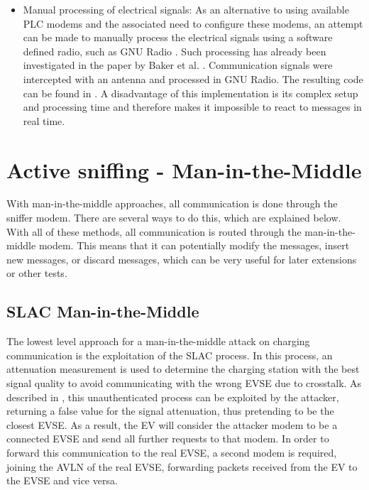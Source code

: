 \documentclass[sigconf]{acmart}
\begin{document}
\begin{itemize}
    \item Manual processing of electrical signals: As an alternative to using available PLC modems and the associated need to configure these modems, an attempt can be made to manually process the electrical signals using a software defined radio, such as GNU Radio \citep{gnuradio}. Such processing has already been investigated in the paper by Baker et al. \citep{baker-losing-2019}. Communication signals were intercepted with an antenna and processed in GNU Radio. The resulting code can be found in \citep{baker-rb-2022}. A disadvantage of this implementation is its complex setup and processing time and therefore makes it impossible to react to messages in real time.
\end{itemize}

\section{Active sniffing - Man-in-the-Middle}
With man-in-the-middle approaches, all communication is done through the sniffer modem. There are several ways to do this, which are explained below. With all of these methods, all communication is routed through the man-in-the-middle modem. This means that it can potentially modify the messages, insert new messages, or discard messages, which can be very useful for later extensions or other tests.

\subsection{SLAC Man-in-the-Middle}
\label{sec:slac-mitm}
The lowest level approach for a man-in-the-middle attack on charging communication is the exploitation of the SLAC process.
In this process, an attenuation measurement is used to determine the charging station with the best signal quality to avoid communicating with the wrong EVSE due to crosstalk.
As described in \citep[pp.\,8--9]{bao_threat_2018}, this unauthenticated process can be exploited by the attacker, returning a false value for the signal attenuation, thus pretending to be the closest EVSE.
As a result, the EV will consider the attacker modem to be a connected EVSE and send all further requests to that modem.
In order to forward this communication to the real EVSE, a second modem is required, joining the AVLN of the real EVSE, forwarding packets received from the EV to the EVSE and vice versa.
\end{document}
